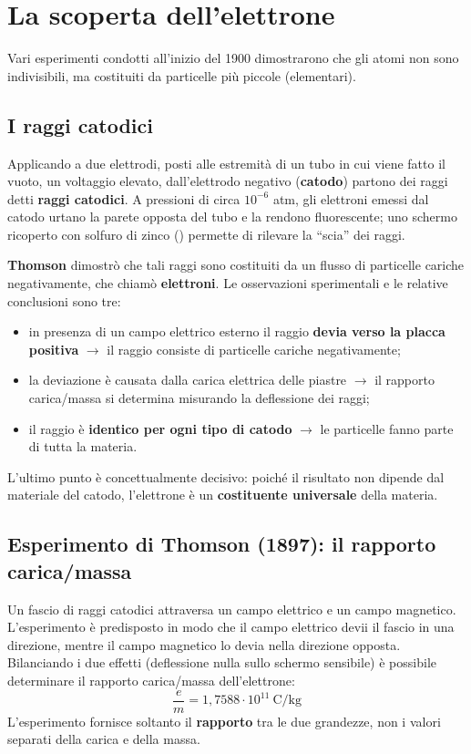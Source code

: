 \documentclass[11pt, a4paper, openright]{book}
\begin{document}
\newpage

\section{La scoperta dell'elettrone}
Vari esperimenti condotti all'inizio del 1900 dimostrarono che gli atomi non sono indivisibili, ma costituiti da particelle più piccole (elementari).

\subsection{I raggi catodici}
Applicando a due elettrodi, posti alle estremità di un tubo in cui viene fatto il vuoto, un voltaggio elevato, dall'elettrodo negativo (\textbf{catodo}) partono dei raggi detti \textbf{raggi catodici}. A pressioni di circa $10^{-6}$ atm, gli elettroni emessi dal catodo urtano la parete opposta del tubo e la rendono fluorescente; uno schermo ricoperto con solfuro di zinco () permette di rilevare la ``scia'' dei raggi.

\textbf{Thomson} dimostrò che tali raggi sono costituiti da un flusso di particelle cariche negativamente, che chiamò \textbf{elettroni}. Le osservazioni sperimentali e le relative conclusioni sono tre:
\begin{itemize}
    \item in presenza di un campo elettrico esterno il raggio \textbf{devia verso la placca positiva} $\rightarrow$ il raggio consiste di particelle cariche negativamente;
    \item la deviazione è causata dalla carica elettrica delle piastre $\rightarrow$ il rapporto carica/massa si determina misurando la deflessione dei raggi;
    \item il raggio è \textbf{identico per ogni tipo di catodo} $\rightarrow$ le particelle fanno parte di tutta la materia.
\end{itemize}
L'ultimo punto è concettualmente decisivo: poiché il risultato non dipende dal materiale del catodo, l'elettrone è un \textbf{costituente universale} della materia.

\subsection{Esperimento di Thomson (1897): il rapporto carica/massa}
Un fascio di raggi catodici attraversa un campo elettrico e un campo magnetico. L'esperimento è predisposto in modo che il campo elettrico devii il fascio in una direzione, mentre il campo magnetico lo devia nella direzione opposta. Bilanciando i due effetti (deflessione nulla sullo schermo sensibile) è possibile determinare il rapporto carica/massa dell'elettrone:
\[
\frac{e}{m} = 1{,}7588 \cdot 10^{11}\ \mathrm{C/kg}
\]
L'esperimento fornisce soltanto il \textbf{rapporto} tra le due grandezze, non i valori separati della carica e della massa.
\end{document}
